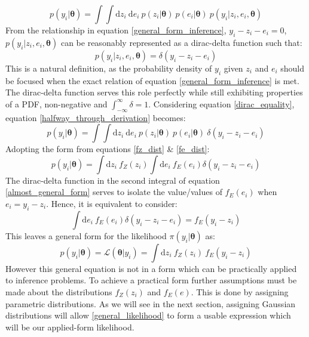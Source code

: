 \begin{equation}
p(y_i|\bm{\theta}) = \int \int \text{d}z_i\ \text{d}e_i\ p(z_i|\bm{\theta})\ p(e_i|\bm{\theta})\ p(y_i|z_i,e_i,\bm{\theta})
\label{halfway_through_derivation}
\end{equation}
From the relationship in equation \ref{general_form_inference}, $y_i-z_i-e_i = 0$, $p(y_i|z_i,e_i,\bm{\theta})$ can be reasonably represented as a dirac-delta function such that:
\begin{equation}
p(y_i|z_i,e_i,\bm{\theta}) = \delta(y_i-z_i-e_i)
\label{dirac_equality}
\end{equation}
This is a natural definition, as the probability density of $y_i$ given $z_i$ and $e_i$ should be focused when the exact relation of equation \ref{general_form_inference} is met. The dirac-delta function serves this role perfectly while still exhibiting properties of a PDF, non-negative and $\int_{-\infty}^{\infty}\delta = 1$. Considering equation \ref{dirac_equality}, equation \ref{halfway_through_derivation} becomes:
\begin{equation}
p(y_i|\bm{\theta}) = \int \int \text{d}z_i\ \text{d}e_i\ p(z_i|\bm{\theta})\ p(e_i|\bm{\theta})\ \delta(y_i-z_i-e_i)
\end{equation}
Adopting the form from equations \ref{fz_dist} \& \ref{fe_dist}:
\begin{equation}
p(y_i|\bm{\theta}) = \int \text{d}z_i\ f_Z(z_i) \int \text{d}e_i\ f_E(e_i) \delta(y_i-z_i-e_i)
\label{almost_general_form}
\end{equation}
The dirac-delta function in the second integral of equation \ref{almost_general_form} serves to isolate the value/values of $f_E(e_i)$ when $e_i = y_i - z_i$. Hence, it is equivalent to consider:
\begin{equation}
\int \text{d}e_i\ f_E(e_i) \delta(y_i-z_i-e_i) = f_E(y_i - z_i)
\end{equation}
This leaves a general form for the likelihood $\pi(y_i|\bm{\theta})$ as: 
\begin{equation}
p(y_i|\bm{\theta}) = \mathcal{L}(\bm{\theta}|y_i) = \int \text{d}z_i\ f_Z(z_i)\ f_E(y_i - z_i)
\label{general_likelihood}
\end{equation}
However this general equation is not in a form which can be practically applied to inference problems. To achieve a practical form further assumptions must be made about the distributions $f_Z(z_i)$ and $f_E(e)$. This is done by assigning parametric distributions. As we will see in the next section, assigning Gaussian distributions will allow \ref{general_likelihood} to form a usable expression which will be our applied-form likelihood.

